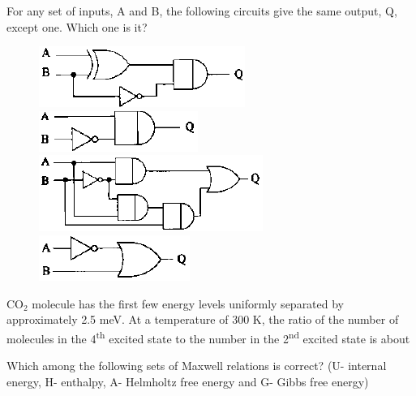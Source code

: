 \documentclass{exam}
\begin{document}
\begin{questions}
\question For any set of inputs, A and B, the following circuits give the same output, Q, except one. Which one is it?\hfill{}

\begin{oneparchoices}
\begin{figure}[H]
	\choice \caption*{} \label{41a} \includegraphics[width=0.51\columnwidth]{pics/41a.png}
	\choice \caption*{} \label{41b} \includegraphics[width=0.51\columnwidth]{pics/41b.png}
	\choice \caption*{} \label{41c} \includegraphics[width=0.51\columnwidth]{pics/41c.png}
	\choice \caption*{} \label{41d} \includegraphics[width=0.51\columnwidth]{pics/41d.png}
\end{figure}
\end{oneparchoices}

\question CO$_2$ molecule has the first few energy levels uniformly separated by approximately 2.5 meV. At a temperature of 300 K, the ratio of the number of molecules in the 4\textsuperscript{th} excited state to the number in the 2\textsuperscript{nd} excited state is about\hfill{}

\begin{oneparchoices}
	   
\end{oneparchoices}

\question Which among the following sets of Maxwell relations is correct? (U- internal energy, H- enthalpy, A- Helmholtz free energy and G- Gibbs free energy)\hfill{}


\end{questions}
\end{document}
